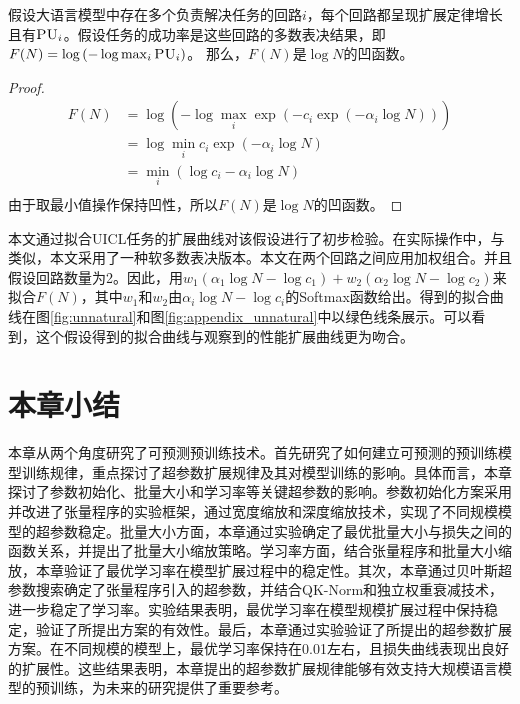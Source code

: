 \begin{theorem}
假设大语言模型中存在多个负责解决任务的回路\(i\)，每个回路都呈现扩展定律增长且有\(\textsc{PU}_i\)。假设任务的成功率是这些回路的多数表决结果，即\(F(N)  = \operatorname{log}\left(-\operatorname{log}\max_i \textsc{PU}_i\right)\)。
那么，\(F(N)\)是\(\operatorname{log}N\)的凹函数。
\end{theorem}

\begin{proof}
    \begin{equation}
    \label{eq:app_th_2}
    \begin{split}
    F(N) &= \operatorname{log}\left(-\operatorname{log}\max_i \operatorname{exp}\left(- c_i \operatorname{exp}(-\alpha_i \operatorname{log} N)\right)\right) \\
        &= \operatorname{log} \min_i  c_i \operatorname{exp}(-\alpha_i \operatorname{log} N) \\
    &=  \min_i (\operatorname{log} c_i-\alpha_i \operatorname{log} N) \\
    \end{split}
    \end{equation}
    由于取最小值操作保持凹性，所以\(F(N)\)是\(\operatorname{log}N\)的凹函数。 
\end{proof}


本文通过拟合UICL任务的扩展曲线对该假设进行了初步检验。在实际操作中，与\citet{varma2023explaining}类似，本文采用了一种软多数表决版本。本文在两个回路之间应用加权组合。并且假设回路数量为2。因此，用\({w_1}({\alpha_1}\log N-\log{c_1}) + {w_2}({\alpha_2}\log N - \log c_2)\)来拟合\(F(N)\)，其中\(w_1\)和\(w_2\)由\({\alpha_i}\log N -\log {c_i}\)的Softmax函数给出。得到的拟合曲线在图\ref{fig:unnatural}和图\ref{fig:appendix_unnatural}中以{\color[rgb]{0.3, 0.6, 0.45}绿色}线条展示。可以看到，这个假设得到的拟合曲线与观察到的性能扩展曲线更为吻合。 



\section{本章小结}
本章从两个角度研究了可预测预训练技术。首先研究了如何建立可预测的预训练模型训练规律，重点探讨了超参数扩展规律及其对模型训练的影响。具体而言，本章探讨了参数初始化、批量大小和学习率等关键超参数的影响。参数初始化方案采用并改进了张量程序的实验框架，通过宽度缩放和深度缩放技术，实现了不同规模模型的超参数稳定。批量大小方面，本章通过实验确定了最优批量大小与损失之间的函数关系，并提出了批量大小缩放策略。学习率方面，结合张量程序和批量大小缩放，本章验证了最优学习率在模型扩展过程中的稳定性。其次，本章通过贝叶斯超参数搜索确定了张量程序引入的超参数，并结合QK-Norm和独立权重衰减技术，进一步稳定了学习率。实验结果表明，最优学习率在模型规模扩展过程中保持稳定，验证了所提出方案的有效性。最后，本章通过实验验证了所提出的超参数扩展方案。在不同规模的模型上，最优学习率保持在0.01左右，且损失曲线表现出良好的扩展性。这些结果表明，本章提出的超参数扩展规律能够有效支持大规模语言模型的预训练，为未来的研究提供了重要参考。

